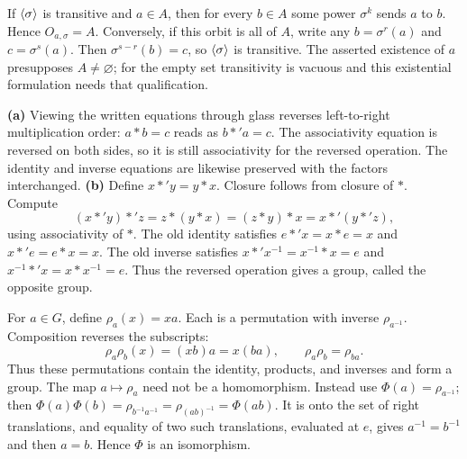 If $\langle \sigma\rangle$ is transitive and $a\in A$, then for every $b\in A$ some power $\sigma^k$ sends $a$ to $b$. Hence $O_{a,\sigma}=A$. Conversely, if this orbit is all of $A$, write any $b=\sigma^r(a)$ and $c=\sigma^s(a)$. Then $\sigma^{s-r}(b)=c$, so $\langle \sigma\rangle$ is transitive. The asserted existence of $a$ presupposes $A\ne\varnothing$; for the empty set transitivity is vacuous and this existential formulation needs that qualification.

\textbf{(a)} Viewing the written equations through glass reverses left-to-right multiplication order: $a*b=c$ reads as $b*'a=c$. The associativity equation is reversed on both sides, so it is still associativity for the reversed operation. The identity and inverse equations are likewise preserved with the factors interchanged.
\textbf{(b)} Define $x*'y=y*x$. Closure follows from closure of $*$. Compute
\[(x*'y)*'z=z*(y*x)=(z*y)*x=x*'(y*'z),\]
using associativity of $*$. The old identity satisfies $e*'x=x*e=x$ and $x*'e=e*x=x$. The old inverse satisfies $x*'x^{-1}=x^{-1}*x=e$ and $x^{-1}*'x=x*x^{-1}=e$. Thus the reversed operation gives a group, called the opposite group.

For $a\in G$, define $\rho_a(x)=xa$. Each is a permutation with inverse $\rho_{a^{-1}}$. Composition reverses the subscripts:
\[\rho_a\rho_b(x)=(xb)a=x(ba),\qquad\rho_a\rho_b=\rho_{ba}.\]
Thus these permutations contain the identity, products, and inverses and form a group. The map $a\mapsto\rho_a$ need not be a homomorphism. Instead use $\Phi(a)=\rho_{a^{-1}}$; then
$\Phi(a)\Phi(b)=\rho_{b^{-1}a^{-1}}=\rho_{(ab)^{-1}}=\Phi(ab)$.
It is onto the set of right translations, and equality of two such translations, evaluated at $e$, gives $a^{-1}=b^{-1}$ and then $a=b$. Hence $\Phi$ is an isomorphism.

